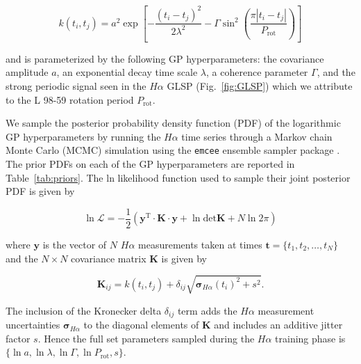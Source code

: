 \documentclass[longauth]{aa}
\newcommand{\prot}{$P_{\text{rot}}$}
\begin{document}
\begin{equation}
    k(t_i,t_j) = a^2 \exp{\left[ -\frac{(t_i-t_j)^2}{2\lambda^2} -\Gamma \sin^2{\left( \frac{\pi |t_i-t_j|}{P_{\text{rot}}} \right)} \right]}
    \label{eq:kernel}
\end{equation}

\noindent and is parameterized by the following GP hyperparameters: the covariance amplitude $a$, an exponential decay time scale $\lambda$, a coherence parameter $\Gamma$, and the strong periodic signal seen in the $H\alpha$ GLSP (Fig.~\ref{fig:GLSP}) which we attribute to the L 98-59 rotation period \prot{.} 

We sample the posterior probability density function (PDF) of the logarithmic GP hyperparameters by running the $H\alpha$ time series through a Markov chain Monte Carlo (MCMC) simulation using the \texttt{emcee} ensemble sampler package \citep{foremanmackey13}. The prior PDFs on each of the GP hyperparameters are reported in Table~\ref{tab:priors}. The ln likelihood function used to sample their joint posterior PDF is given by 

\begin{equation}
    \ln{\mathcal{L}} = -\frac{1}{2} \left( \mathbf{y}^{\text{T}}\cdot \mathbf{K}\cdot \mathbf{y} + \ln{\text{det}\mathbf{K}} + N\ln{2\pi} \right)
\end{equation}

\noindent where $\textbf{y}$ is the vector of $N$ $H\alpha$ measurements taken at times $\mathbf{t}=\{t_1,t_2,\dots,t_N \}$ and the $N \times N$ covariance matrix $\mathbf{K}$ is given by

\begin{equation}
    \mathbf{K}_{ij} = k(t_i,t_j) + \delta_{ij}\sqrt{\boldsymbol{\sigma}_{H\alpha}(t_i)^2 + s^2}.
\end{equation}

\noindent The inclusion of the Kronecker delta $\delta_{ij}$ term adds the $H\alpha$ measurement uncertainties $\boldsymbol{\sigma}_{H\alpha}$ to the diagonal elements of $\mathbf{K}$ and includes an additive jitter factor $s$. Hence the full set parameters sampled during the $H\alpha$ training phase is $\{ \ln{a}, \ln{\lambda}, \ln{\Gamma}, \ln{P_{\text{rot}}}, s \}$.
\end{document}
